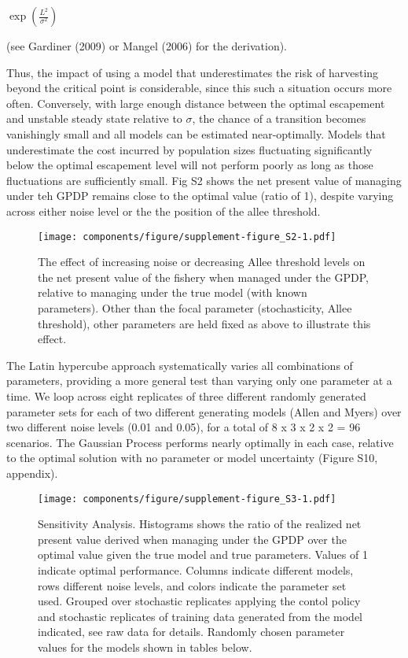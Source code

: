 \documentclass[]{components/elsarticle}
\begin{document}
$\exp\left(\frac{L^2}{\sigma^2}\right)$

(see Gardiner (2009) or Mangel (2006) for the derivation).

Thus, the impact of using a model that underestimates the risk of
harvesting beyond the critical point is considerable, since this such a
situation occurs more often. Conversely, with large enough distance
between the optimal escapement and unstable steady state relative to
$\sigma$, the chance of a transition becomes vanishingly small and all
models can be estimated near-optimally. Models that underestimate the
cost incurred by population sizes fluctuating significantly below the
optimal escapement level will not perform poorly as long as those
fluctuations are sufficiently small. Fig S2 shows the net present value
of managing under teh GPDP remains close to the optimal value (ratio of
1), despite varying across either noise level or the the position of the
allee threshold.

\begin{figure}[htbp]
\centering
\texttt{[image: components/figure/supplement-figure\_S2-1.pdf]}
\caption{The effect of increasing noise or decreasing Allee threshold
levels on the net present value of the fishery when managed under the
GPDP, relative to managing under the true model (with known parameters).
Other than the focal parameter (stochasticity, Allee threshold), other
parameters are held fixed as above to illustrate this effect.}
\end{figure}

The Latin hypercube approach systematically varies all combinations of
parameters, providing a more general test than varying only one
parameter at a time. We loop across eight replicates of three different
randomly generated parameter sets for each of two different generating
models (Allen and Myers) over two different noise levels (0.01 and
0.05), for a total of 8 x 3 x 2 x 2 = 96 scenarios. The Gaussian Process
performs nearly optimally in each case, relative to the optimal solution
with no parameter or model uncertainty (Figure S10, appendix).

\begin{figure}[htbp]
\centering
\texttt{[image: components/figure/supplement-figure\_S3-1.pdf]}
\caption{Sensitivity Analysis. Histograms shows the ratio of the
realized net present value derived when managing under the GPDP over the
optimal value given the true model and true parameters. Values of 1
indicate optimal performance. Columns indicate different models, rows
different noise levels, and colors indicate the parameter set used.
Grouped over stochastic replicates applying the contol policy and
stochastic replicates of training data generated from the model
indicated, see raw data for details. Randomly chosen parameter values
for the models shown in tables below.}
\end{figure}
\end{document}
